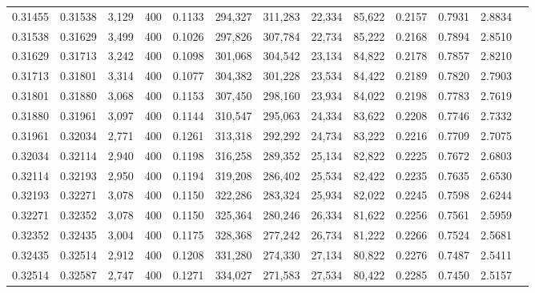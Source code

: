 \begin{tabular}{rrrrrrrrrrrrr}
0.31455 & 0.31538 &  3,129 & 400 &                                     0.1133 & 294,327 & 311,283 &  22,334 &  85,622 & 0.2157 & 0.7931 & 2.8834 \\
0.31538 & 0.31629 &  3,499 & 400 &                                     0.1026 & 297,826 & 307,784 &  22,734 &  85,222 & 0.2168 & 0.7894 & 2.8510 \\
0.31629 & 0.31713 &  3,242 & 400 &                                     0.1098 & 301,068 & 304,542 &  23,134 &  84,822 & 0.2178 & 0.7857 & 2.8210 \\
0.31713 & 0.31801 &  3,314 & 400 &                                     0.1077 & 304,382 & 301,228 &  23,534 &  84,422 & 0.2189 & 0.7820 & 2.7903 \\
0.31801 & 0.31880 &  3,068 & 400 &                                     0.1153 & 307,450 & 298,160 &  23,934 &  84,022 & 0.2198 & 0.7783 & 2.7619 \\
0.31880 & 0.31961 &  3,097 & 400 &                                     0.1144 & 310,547 & 295,063 &  24,334 &  83,622 & 0.2208 & 0.7746 & 2.7332 \\
0.31961 & 0.32034 &  2,771 & 400 &                                     0.1261 & 313,318 & 292,292 &  24,734 &  83,222 & 0.2216 & 0.7709 & 2.7075 \\
0.32034 & 0.32114 &  2,940 & 400 &                                     0.1198 & 316,258 & 289,352 &  25,134 &  82,822 & 0.2225 & 0.7672 & 2.6803 \\
0.32114 & 0.32193 &  2,950 & 400 &                                     0.1194 & 319,208 & 286,402 &  25,534 &  82,422 & 0.2235 & 0.7635 & 2.6530 \\
0.32193 & 0.32271 &  3,078 & 400 &                                     0.1150 & 322,286 & 283,324 &  25,934 &  82,022 & 0.2245 & 0.7598 & 2.6244 \\
0.32271 & 0.32352 &  3,078 & 400 &                                     0.1150 & 325,364 & 280,246 &  26,334 &  81,622 & 0.2256 & 0.7561 & 2.5959 \\
0.32352 & 0.32435 &  3,004 & 400 &                                     0.1175 & 328,368 & 277,242 &  26,734 &  81,222 & 0.2266 & 0.7524 & 2.5681 \\
0.32435 & 0.32514 &  2,912 & 400 &                                     0.1208 & 331,280 & 274,330 &  27,134 &  80,822 & 0.2276 & 0.7487 & 2.5411 \\
0.32514 & 0.32587 &  2,747 & 400 &                                     0.1271 & 334,027 & 271,583 &  27,534 &  80,422 & 0.2285 & 0.7450 & 2.5157 \\

\end{tabular}

